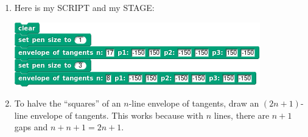 \documentclass[noauthor,nooutcomes,hints]{ximera}
\begin{document}
\begin{question}
\begin{freeResponse}
\begin{enumerate}
\begin{center}
      \end{center}
    \item Here is my SCRIPT and my STAGE:
      \begin{center}
        \includegraphics[width=.3\textwidth]{8-17-lineOfTanScript.png}\qquad{}
      \end{center}
    \item To halve the ``squares'' of an $n$-line envelope of
      tangents, draw an $(2n+1)$-line envelope of tangents. This works
      because with $n$ lines, there are $n+1$ gaps and $n + n+1 =
      2n+1$.
    \end{enumerate}
  \end{freeResponse}
\end{question}
\end{document}
